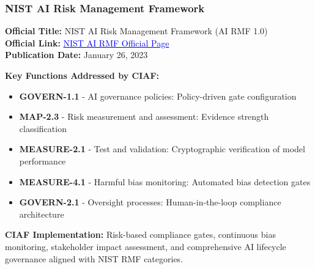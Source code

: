 \documentclass[12pt,a4paper]{article}
\begin{document}
\subsubsection{NIST AI Risk Management Framework}
\begin{valuebox}
\textbf{Official Title:} NIST AI Risk Management Framework (AI RMF 1.0)\\
\textbf{Official Link:} \href{https://www.nist.gov/itl/ai-risk-management-framework}{\textcolor{blue}{NIST AI RMF Official Page}}\\
\textbf{Publication Date:} January 26, 2023

\textbf{Key Functions Addressed by CIAF:}
\begin{itemize}
\item \textbf{GOVERN-1.1} - AI governance policies: Policy-driven gate configuration
\item \textbf{MAP-2.3} - Risk measurement and assessment: Evidence strength classification
\item \textbf{MEASURE-2.1} - Test and validation: Cryptographic verification of model performance
\item \textbf{MEASURE-4.1} - Harmful bias monitoring: Automated bias detection gates
\item \textbf{GOVERN-2.1} - Oversight processes: Human-in-the-loop compliance architecture
\end{itemize}

\textbf{CIAF Implementation:} Risk-based compliance gates, continuous bias monitoring, stakeholder impact assessment, and comprehensive AI lifecycle governance aligned with NIST RMF categories.
\end{valuebox}
\end{document}

